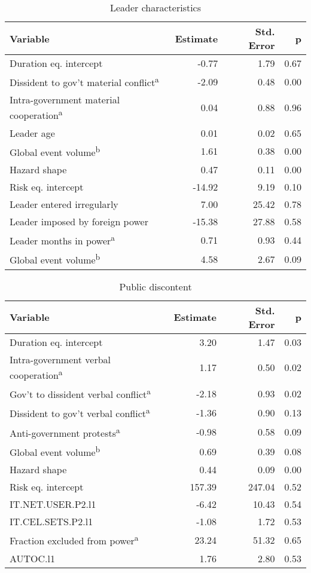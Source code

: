 \begin{table}[ht]
\centering
\caption{Leader characteristics} 
\label{theme1}
\begin{tabular}{p{3in}rrr}
  \toprule
Variable & Estimate & Std. Error & p \\ 
  \midrule
Duration eq. intercept & -0.77 & 1.79 & 0.67 \\ 
  Dissident to gov't material conflict\textsuperscript{a} & -2.09 & 0.48 & 0.00 \\ 
  Intra-government material cooperation\textsuperscript{a} & 0.04 & 0.88 & 0.96 \\ 
  Leader age & 0.01 & 0.02 & 0.65 \\ 
  Global event volume\textsuperscript{b} & 1.61 & 0.38 & 0.00 \\ 
  Hazard shape & 0.47 & 0.11 & 0.00 \\ 
  \midrule Risk eq. intercept & -14.92 & 9.19 & 0.10 \\ 
  Leader entered irregularly & 7.00 & 25.42 & 0.78 \\ 
  Leader imposed by foreign power & -15.38 & 27.88 & 0.58 \\ 
  Leader months in power\textsuperscript{a} & 0.71 & 0.93 & 0.44 \\ 
  Global event volume\textsuperscript{b} & 4.58 & 2.67 & 0.09 \\ 
   \bottomrule
\end{tabular}
\end{table}

\begin{table}[ht]
\centering
\caption{Public discontent} 
\label{theme2}
\begin{tabular}{p{3in}rrr}
  \toprule
Variable & Estimate & Std. Error & p \\ 
  \midrule
Duration eq. intercept & 3.20 & 1.47 & 0.03 \\ 
  Intra-government verbal cooperation\textsuperscript{a} & 1.17 & 0.50 & 0.02 \\ 
  Gov't to dissident verbal conflict\textsuperscript{a} & -2.18 & 0.93 & 0.02 \\ 
  Dissident to gov't verbal conflict\textsuperscript{a} & -1.36 & 0.90 & 0.13 \\ 
  Anti-government protests\textsuperscript{a} & -0.98 & 0.58 & 0.09 \\ 
  Global event volume\textsuperscript{b} & 0.69 & 0.39 & 0.08 \\ 
  Hazard shape & 0.44 & 0.09 & 0.00 \\ 
  \midrule Risk eq. intercept & 157.39 & 247.04 & 0.52 \\ 
  IT.NET.USER.P2.l1 & -6.42 & 10.43 & 0.54 \\ 
  IT.CEL.SETS.P2.l1 & -1.08 & 1.72 & 0.53 \\ 
  Fraction excluded from power\textsuperscript{a} & 23.24 & 51.32 & 0.65 \\ 
  AUTOC.l1 & 1.76 & 2.80 & 0.53 \\ 
   \bottomrule
\end{tabular}
\end{table}

